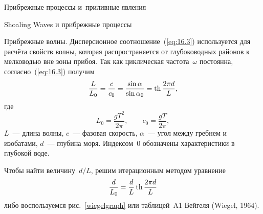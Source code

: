 \begin{chapter}{Прибрежные процессы и~приливные явления}
\begin{section}{Shoaling Waves и прибрежные процессы}
\begin{paragraph}{Прибрежные волны.}
Дисперсионное соотношение~(\ref{eq:16.3}) используется для расчёта свойств
волны, которая распространяется от глубоководных районов к мелководью
вне зоны прибоя. Так как циклическая частота~$\omega$ постоянна, 
согласно~(\ref{eq:16.3}) получим
\begin{equation}\label{eq:intermed}
 \frac{L}{L_{0}} = \frac{c}{c_{0}}=\frac{\sin \alpha }{\sin \alpha _{0}} 
                 = \mathop{\mathrm{th}}\nolimits \frac{2 \pi d}{L}, 
\end{equation}
где
\begin{equation}\label{eq:Lzero}
 L_{0} = \frac{g T^{2}}{2 \pi }, \qquad 
 c_{0} = \frac{g T}{2 \pi }, 
\end{equation}
$L$~--- длина волны, $c$~--- фазовая скорость, $\alpha $~--- угол
между гребнем и изобатами, $d$~--- глубина моря. Индексом~$0$
обозначены характеристики в глубокой воде.
%

Чтобы найти величину~$d/L$, решим итерационным методом уравнение
\begin{equation}\label{eq:intermediate}
 \frac{d}{L_{0}} = \frac{d}{L} \mathop{\mathrm{th}}\nolimits \frac{2 \pi d}{L} 
\end{equation}
либо воспользуемся рис.~\ref{wiegelgraph} или таблицей~A1 
Вейгеля (Wiegel, 1964).
%


\end{paragraph}
\end{section}
\end{chapter}

